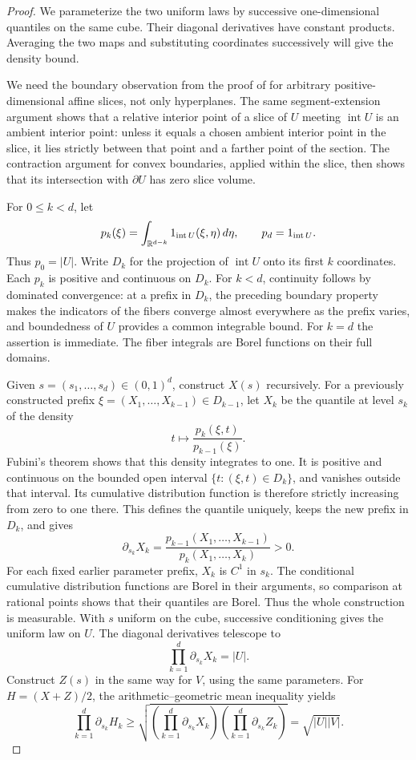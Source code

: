 \begin{proof}
We parameterize the two uniform laws by successive one-dimensional
quantiles on the same cube. Their diagonal derivatives have constant
products. Averaging the two maps and substituting coordinates successively
will give the density bound.

We need the boundary observation from the proof of 
for arbitrary positive-dimensional affine slices, not only hyperplanes.
The same segment-extension argument shows that a relative interior point
of a slice of $U$ meeting $\operatorname{int}U$ is an ambient interior
point: unless it equals a chosen ambient interior point in the slice,
it lies strictly between that point and a farther point of the section.
The contraction argument for convex
boundaries, applied within the slice, then shows that its intersection
with $\partial U$ has zero slice volume.

For $0\le k<d$, let
\[
  p_k(\xi)=\int_{\mathbb R^{d-k}}
       1_{\operatorname{int}U}(\xi,\eta)\,d\eta,
  \qquad
  p_d=1_{\operatorname{int}U}.
\]
Thus $p_0=|U|$. Write $D_k$ for the projection of
$\operatorname{int}U$ onto its first $k$ coordinates. Each $p_k$ is
positive and continuous on $D_k$. For $k<d$, continuity follows by
dominated convergence: at a prefix in $D_k$, the preceding boundary
property makes the indicators of the fibers converge almost everywhere
as the prefix varies, and boundedness of $U$ provides a common integrable
bound. For $k=d$ the assertion is immediate. The fiber integrals are
Borel functions on their full domains.

Given $s=(s_1,\ldots,s_d)\in(0,1)^d$, construct $X(s)$ recursively.
For a previously constructed prefix
$\xi=(X_1,\ldots,X_{k-1})\in D_{k-1}$, let $X_k$ be the quantile
at level $s_k$ of the density
\[
  t\longmapsto \frac{p_k(\xi,t)}{p_{k-1}(\xi)}.
\]
Fubini's theorem shows that this density integrates to one. It is
positive and continuous on the bounded open interval
$\{t:(\xi,t)\in D_k\}$, and vanishes outside that interval.
Its cumulative distribution function is therefore strictly increasing
from zero to one there. This defines the quantile uniquely, keeps the
new prefix in $D_k$, and gives
\[
  \partial_{s_k}X_k
   =\frac{p_{k-1}(X_1,\ldots,X_{k-1})}
          {p_k(X_1,\ldots,X_k)}>0.
\]
For each fixed earlier parameter prefix, $X_k$ is $C^1$ in $s_k$.
The conditional cumulative distribution functions are Borel in their
arguments, so comparison at rational points shows that their quantiles
are Borel. Thus the whole construction is measurable. With $s$ uniform
on the cube, successive conditioning gives the uniform law on $U$.
The diagonal derivatives telescope to
\[
  \prod_{k=1}^d\partial_{s_k}X_k=|U|.
\]
Construct $Z(s)$ in the same way for $V$, using the same parameters.
For $H=(X+Z)/2$, the arithmetic--geometric mean inequality yields
\[
  \prod_{k=1}^d\partial_{s_k}H_k
  \ge
  \sqrt{\left(\prod_{k=1}^d\partial_{s_k}X_k\right)
              \left(\prod_{k=1}^d\partial_{s_k}Z_k\right)}
  =\sqrt{|U||V|}.
\]


\end{proof}
